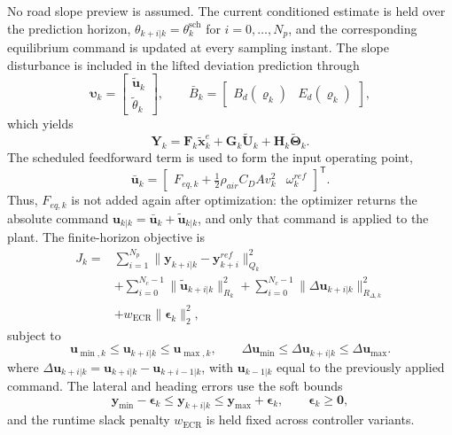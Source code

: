 \documentclass{ieeeaccess}
\begin{document}
No road slope preview is assumed. The current conditioned estimate is held over the prediction horizon, $\theta_{k+i|k}=\theta_k^{\mathrm{sch}}$ for $i=0,\ldots,N_p$, and the corresponding equilibrium command is updated at every sampling instant. The slope disturbance is included in the lifted deviation prediction through
\begin{equation}
\bm\upsilon_k=
\begin{bmatrix}\widetilde{\bm u}_k\\\widetilde\theta_k\end{bmatrix},
\qquad
\bar B_k=
\begin{bmatrix}B_d(\boldsymbol\varrho_k)&E_d(\boldsymbol\varrho_k)\end{bmatrix},
\label{eq:augmented_prediction_model}
\end{equation}
which yields
\begin{equation}
\bm Y_k=\bm F_k\widetilde{\bm x}^e_k
+\bm G_k\widetilde{\bm U}_k
+\bm H_k\widetilde{\bm\Theta}_k .
\label{eq:lifted_prediction}
\end{equation}
The scheduled feedforward term is used to form the input operating point,
\begin{equation}
\bar{\bm u}_k=
\begin{bmatrix}
F_{eq,k}+\tfrac12\rho_{air}C_DA v_k^2 & \omega_k^{ref}
\end{bmatrix}^{\mathsf T}.
\label{eq:online_input_operating_point}
\end{equation}
Thus, $F_{eq,k}$ is not added again after optimization: the optimizer returns the absolute command $\bm u_{k|k}=\bar{\bm u}_k+\widetilde{\bm u}_{k|k}$, and only that command is applied to the plant. The finite-horizon objective is
\begin{equation}
\begin{aligned}
J_k={}&\sum_{i=1}^{N_p}
\|\bm y_{k+i|k}-\bm y^{ref}_{k+i}\|_{Q_k}^{2}\\
&+\sum_{i=0}^{N_c-1}\|\widetilde{\bm u}_{k+i|k}\|_{R_k}^{2}
+\sum_{i=0}^{N_c-1}
\|\Delta\bm u_{k+i|k}\|_{R_{\Delta,k}}^{2}\\
&+w_{\mathrm{ECR}}\|\bm\epsilon_k\|_2^2,
\end{aligned}
\label{eq:mpc_cost}
\end{equation}
subject to
\begin{equation}
\bm u_{\min,k}\leq\bm u_{k+i|k}\leq\bm u_{\max,k},
\qquad
\Delta\bm u_{\min}\leq\Delta\bm u_{k+i|k}
\leq\Delta\bm u_{\max}.
\label{eq:input_constraint}
\end{equation}
where $\Delta\bm u_{k+i|k}=\bm u_{k+i|k}-\bm u_{k+i-1|k}$, with $\bm u_{k-1|k}$ equal to the previously applied command. The lateral and heading errors use the soft bounds
\begin{equation}
\bm y_{\min}-\bm\epsilon_k\leq\bm y_{k+i|k}
\leq\bm y_{\max}+\bm\epsilon_k,
\qquad \bm\epsilon_k\geq\bm0,
\label{eq:soft_output_constraint}
\end{equation}
and the runtime slack penalty $w_{\mathrm{ECR}}$ is held fixed across controller variants.
\end{document}
